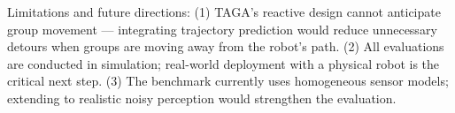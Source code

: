 Limitations and future directions: (1) TAGA's reactive design cannot anticipate group movement — integrating trajectory prediction would reduce unnecessary detours when groups are moving away from the robot's path. (2) All evaluations are conducted in simulation; real-world deployment with a physical robot is the critical next step. (3) The benchmark currently uses homogeneous sensor models; extending to realistic noisy perception would strengthen the evaluation.


